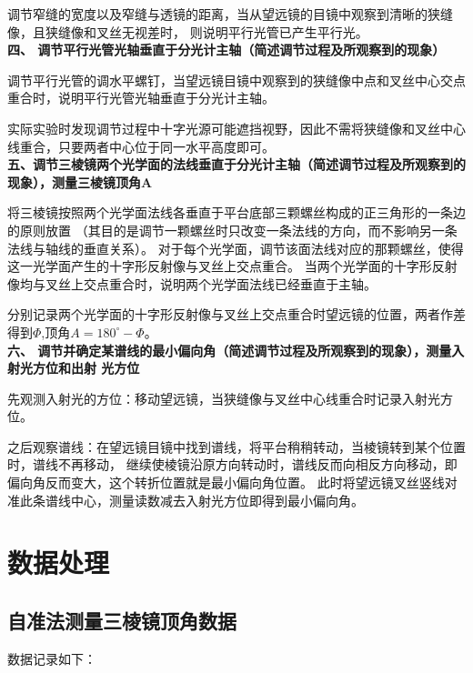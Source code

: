 \documentclass[UTF8]{ctexart}
\begin{document}
调节窄缝的宽度以及窄缝与透镜的距离，当从望远镜的目镜中观察到清晰的狭缝像，且狭缝像和叉丝无视差时，
则说明平行光管已产生平行光。
\\

\noindent  \textbf{四、 调节平行光管光轴垂直于分光计主轴（简述调节过程及所观察到的现象）}

调节平行光管的调水平螺钉，当望远镜目镜中观察到的狭缝像中点和叉丝中心交点重合时，说明平行光管光轴垂直于分光计主轴。

实际实验时发现调节过程中十字光源可能遮挡视野，因此不需将狭缝像和叉丝中心线重合，只要两者中心位于同一水平高度即可。
\\

\noindent  \textbf{五、调节三棱镜两个光学面的法线垂直于分光计主轴（简述调节过程及所观察到的现象），测量三棱镜顶角A}

将三棱镜按照两个光学面法线各垂直于平台底部三颗螺丝构成的正三角形的一条边的原则放置
（其目的是调节一颗螺丝时只改变一条法线的方向，而不影响另一条法线与轴线的垂直关系）。
对于每个光学面，调节该面法线对应的那颗螺丝，使得这一光学面产生的十字形反射像与叉丝上交点重合。
当两个光学面的十字形反射像均与叉丝上交点重合时，说明两个光学面法线已经垂直于主轴。

分别记录两个光学面的十字形反射像与叉丝上交点重合时望远镜的位置，两者作差得到$\Phi$,顶角$A=180^\circ-\Phi$。
\\

\noindent  \textbf{六、 调节并确定某谱线的最小偏向角（简述调节过程及所观察到的现象），测量入射光方位和出射
光方位}

先观测入射光的方位：移动望远镜，当狭缝像与叉丝中心线重合时记录入射光方位。

之后观察谱线：在望远镜目镜中找到谱线，将平台稍稍转动，当棱镜转到某个位置时，谱线不再移动，
继续使棱镜沿原方向转动时，谱线反而向相反方向移动，即偏向角反而变大，这个转折位置就是最小偏向角位置。
此时将望远镜叉丝竖线对准此条谱线中心，测量读数减去入射光方位即得到最小偏向角。


\section{数据处理}
\subsection{自准法测量三棱镜顶角数据}

数据记录如下：
\end{document}
